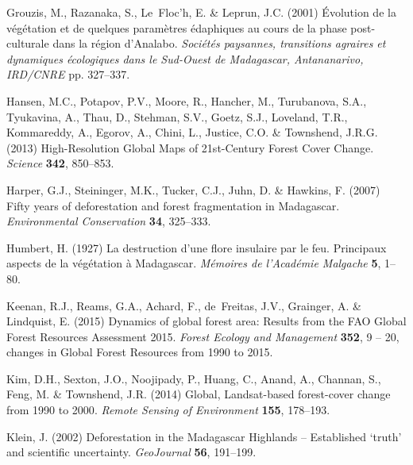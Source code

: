 \documentclass[a4paper, 12pt, leqno]{article} %
\begin{document}
\begin{thebibliography}{60}
Grouzis, M., Razanaka, S., Le~Floc’h, E. \& Leprun, J.C. (2001)
  {{\'E}volution de la v{\'e}g{\'e}tation et de quelques param{\`e}tres
  {\'e}daphiques au cours de la phase post-culturale dans la r{\'e}gion
  d’Analabo}. \emph{Soci{\'e}t{\'e}s paysannes, transitions agraires et
  dynamiques {\'e}cologiques dans le Sud-Ouest de Madagascar, Antananarivo,
  IRD/CNRE} pp. 327--337.

Hansen, M.C., Potapov, P.V., Moore, R., Hancher, M., Turubanova, S.A.,
  Tyukavina, A., Thau, D., Stehman, S.V., Goetz, S.J., Loveland, T.R.,
  Kommareddy, A., Egorov, A., Chini, L., Justice, C.O. \& Townshend, J.R.G.
  (2013) {High-Resolution Global Maps of 21st-Century Forest Cover Change}.
  \emph{Science} \textbf{342}, 850--853.

Harper, G.J., Steininger, M.K., Tucker, C.J., Juhn, D. \& Hawkins, F. (2007)
  {Fifty years of deforestation and forest fragmentation in Madagascar}.
  \emph{Environmental Conservation} \textbf{34}, 325--333.

Humbert, H. (1927) {La destruction d'une flore insulaire par le feu. Principaux
  aspects de la végétation à Madagascar}. \emph{Mémoires de l'Académie
  Malgache} \textbf{5}, 1--80.

Keenan, R.J., Reams, G.A., Achard, F., de~Freitas, J.V., Grainger, A. \&
  Lindquist, E. (2015) {Dynamics of global forest area: Results from the FAO
  Global Forest Resources Assessment 2015}. \emph{Forest Ecology and
  Management} \textbf{352}, 9 -- 20, changes in Global Forest Resources from
  1990 to 2015.

Kim, D.H., Sexton, J.O., Noojipady, P., Huang, C., Anand, A., Channan, S.,
  Feng, M. \& Townshend, J.R. (2014) {Global, Landsat-based forest-cover change
  from 1990 to 2000}. \emph{Remote Sensing of Environment} \textbf{155},
  178--193.

Klein, J. (2002) {Deforestation in the Madagascar Highlands -- Established
  `truth' and scientific uncertainty}. \emph{GeoJournal} \textbf{56}, 191--199.


\end{thebibliography}
\end{document}
